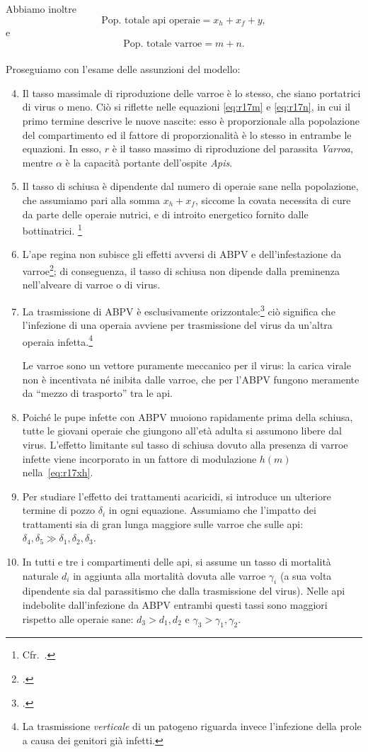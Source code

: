 Abbiamo inoltre
$$\text{Pop. totale api operaie} = x_h + x_f + y,$$
e
$$\text{Pop. totale varroe} = m + n.$$

\paragraph{}
Proseguiamo con l'esame delle assunzioni del modello:
\begin{enumerate}
    \setcounter{enumi}{3}
    \item Il tasso massimale di riproduzione delle varroe è lo stesso, che siano portatrici di virus o meno.
    Ciò si riflette nelle equazioni \eqref{eq:r17m} e \eqref{eq:r17n}, in cui il primo termine descrive le nuove nascite: esso è proporzionale alla popolazione del compartimento ed il fattore di proporzionalità è lo stesso in entrambe le equazioni. In esso, $r$ è il tasso massimo di riproduzione del parassita \emph{Varroa}, mentre $\alpha$ è la capacità portante dell'ospite \emph{Apis}.
    \item Il tasso di schiusa è dipendente dal numero di operaie sane nella popolazione, che assumiamo pari alla somma
    $x_h + x_f$, siccome la covata necessita di cure da parte delle operaie nutrici, e di introito energetico fornito
    dalle bottinatrici.
    \footnote{Cfr.~\cite{khoury2011}.}
    \item L'ape regina non subisce gli effetti avversi di ABPV e dell'infestazione da varroe\footcite{privFDL}; di conseguenza, il tasso di schiusa non dipende dalla preminenza nell'alveare di varroe o di virus.
    \item La trasmissione di ABPV è esclusivamente orizzontale:\footcite{privFDL}
    ciò significa che l'infezione di una operaia avviene per trasmissione del virus da un'altra operaia infetta.\footnote{La trasmissione \emph{verticale} di un patogeno riguarda invece l'infezione della prole a causa dei genitori già infetti.}

    Le varroe sono un vettore puramente meccanico per il virus: la carica virale non è incentivata né
    inibita dalle varroe, che per l'ABPV fungono meramente da ``mezzo di trasporto'' tra le api.
    \item Poiché le pupe infette con ABPV muoiono rapidamente prima della schiusa, tutte le giovani operaie che
    giungono all'età adulta si assumono libere dal virus. L'effetto limitante sul tasso di schiusa dovuto alla
    presenza di varroe infette viene incorporato in un fattore di modulazione $h(m)$ nella~\eqref{eq:r17xh}.
    \item Per studiare l'effetto dei trattamenti acaricidi, si introduce un ulteriore termine di pozzo $\delta_i$ in ogni equazione. Assumiamo che l'impatto dei trattamenti sia di gran lunga maggiore sulle varroe che sulle api: $\delta_4, \delta_5 \gg \delta_1, \delta_2, \delta_3$.
    \item In tutti e tre i compartimenti delle api, si assume un tasso di mortalità naturale $d_i$ in aggiunta alla mortalità dovuta alle varroe $\gamma_i$ (a sua volta dipendente sia dal parassitismo che dalla trasmissione del virus). Nelle api indebolite dall'infezione da ABPV entrambi questi tassi sono maggiori rispetto alle operaie sane: $d_3 > d_1, d_2$ e $\gamma_3 > \gamma_1, \gamma_2$.


\end{enumerate}

